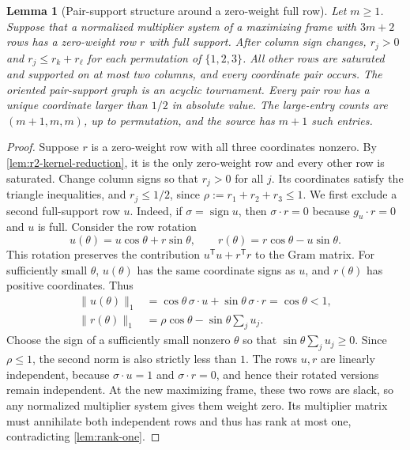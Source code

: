 \documentclass[11pt]{article}
\numberwithin{equation}{section}
\newtheorem{lemma}[lemma]{Lemma}
\theoremstyle{definition}
\theoremstyle{definition}
\begin{document}
\begin{lemma}[Pair-support structure around a zero-weight full row]
\label{lem:r2-full-kernel-structure}
Let $m\ge1$. Suppose that a normalized multiplier system of a
maximizing frame with $3m+2$ rows has a zero-weight row $r$
with full support.
After column sign changes, $r_j>0$ and $r_j\le r_k+r_\ell$
for each permutation of $\{1,2,3\}$.
All other rows are saturated and supported on at most two columns,
and every coordinate pair occurs. The oriented pair-support graph
is an acyclic tournament. Every pair row has a unique coordinate
larger than $1/2$ in absolute value. The large-entry counts are
$(m+1,m,m)$, up to permutation, and the source has $m+1$ such entries.
\end{lemma}
\begin{proof}
Suppose $r$ is a zero-weight row with all three coordinates
nonzero. By \cref{lem:r2-kernel-reduction}, it is the only
zero-weight row and every other row is saturated.
Change column signs so that $r_j>0$ for all $j$.
Its coordinates satisfy the triangle inequalities, and
$r_j\le1/2$, since $\rho:=r_1+r_2+r_3\le1$.
We first exclude a second full-support row $u$.
Indeed, if $\sigma=\operatorname{sign}u$, then
$\sigma\cdot r=0$ because $g_u\cdot r=0$ and $u$ is full.
Consider the row rotation
\[
 u(\theta)=u\cos\theta+r\sin\theta,\qquad
 r(\theta)=r\cos\theta-u\sin\theta.
\]
This rotation preserves the contribution
$u^{\mathsf T}u+r^{\mathsf T}r$ to the Gram matrix.
For sufficiently small $\theta$, $u(\theta)$ has the same coordinate
signs as $u$, and $r(\theta)$ has positive coordinates.  Thus
\[
 \begin{aligned}
 \|u(\theta)\|_1
 &=\cos\theta\,\sigma\cdot u
   +\sin\theta\,\sigma\cdot r=\cos\theta<1,\\
 \|r(\theta)\|_1
 &=\rho\cos\theta-\sin\theta\sum_j u_j.
 \end{aligned}
\]
Choose the sign of a sufficiently small nonzero $\theta$ so that
$\sin\theta\sum_j u_j\ge0$.  Since $\rho\le1$, the second norm
is also strictly less than $1$.  The rows $u,r$ are linearly
independent, because $\sigma\cdot u=1$ and $\sigma\cdot r=0$,
and hence their rotated versions remain independent.
At the new maximizing frame, these two rows are slack, so any
normalized multiplier system gives them weight zero.  Its multiplier
matrix must annihilate both independent rows and thus has rank at most
one, contradicting \cref{lem:rank-one}.


\end{proof}
\end{document}

